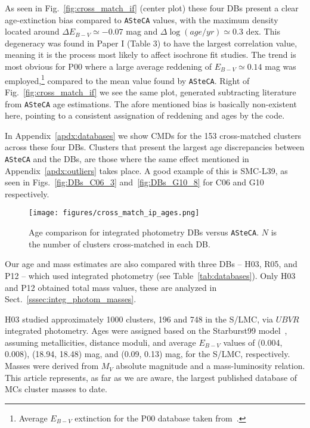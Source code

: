 \documentclass[referee]{aa}
\begin{document}
As seen in Fig.~\ref{fig:cross_match_if} (center plot) these four DBs
present a clear age-extinction bias compared to \texttt{ASteCA} values, with the
maximum density located around $\Delta E_{B-V}{\simeq-}0.07$ mag and
$\Delta\log(age/yr){\simeq}0.3$ dex.
This degeneracy was found in Paper I (Table 3) to have the largest
correlation value, meaning it is the process most likely to affect isochrone fit
studies.
The trend is most obvious for P00 where a large average reddening of
$E_{B-V}{\simeq}0.14$ mag was employed,\footnote{Average $E_{B-V}$
extinction for the P00 database taken from~\cite{de_Grijs_2006}.}
compared to the mean value found by \texttt{ASteCA}.
%
Right of Fig.~\ref{fig:cross_match_if} we see the same plot,
generated subtracting literature from \texttt{ASteCA} age estimations.
The afore mentioned bias is basically non-existent here, pointing to a
consistent assignation of reddening and ages by the code.

In Appendix~\ref{apdx:databases} we show CMDs for the 153 cross-matched
clusters across these four DBs.
Clusters that present the largest age discrepancies between
\texttt{ASteCA} and the DBs, are those where the same effect mentioned in
Appendix~\ref{apdx:outliers} takes place. A good example of this is SMC-L39, as
seen in Figs.~\ref{fig:DBs_C06_3} and~\ref{fig:DBs_G10_8} for C06 and G10
respectively.\\


%

\begin{figure}
\centering
\texttt{[image: figures/cross\_match\_ip\_ages.png]}
\caption{Age comparison for integrated photometry DBs versus \texttt{ASteCA}.
$N$ is the number of clusters cross-matched in each DB.\@}
\label{fig:cross_match_ip_age}
\end{figure}

Our age and mass estimates are also compared with three DBs -- H03, R05, and P12
-- which used integrated photometry (see Table~\ref{tab:databases}). Only H03
and P12 obtained total mass values, these are analyzed in
Sect.~\ref{sssec:integ_photom_masses}.

H03 studied approximately 1000 clusters, 196 and 748 in the S/LMC, via $UBVR$
integrated photometry.
Ages were assigned based on the Starburst99
model~\citep{Leitherer_1999}, assuming metallicities, distance moduli, and
average $E_{B-V}$ values of (0.004, 0.008), (18.94, 18.48) mag, and 
(0.09, 0.13) mag, for the S/LMC, respectively.
%
Masses were derived from $M_V$ absolute magnitude and a mass-luminosity
relation.
This article represents, as far as we are aware, the largest published database
of MCs cluster masses to date.
\end{document}
